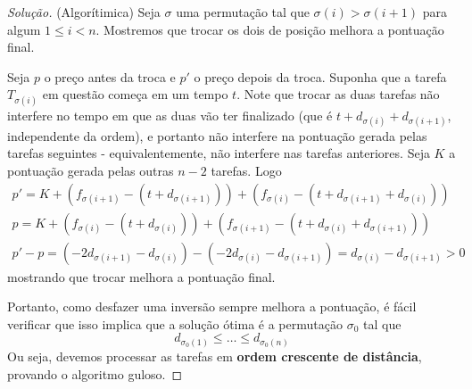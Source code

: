 \documentclass{article}
\newenvironment{solutionenv}{\begin{adjustwidth}{0.25cm}{0.25cm}\begin{proof}[Solução]}{\end{proof}\end{adjustwidth}}
\begin{document}
\begin{solutionenv}(Algorítimica)
  Seja \(\sigma\) uma permutação tal que \(\sigma(i) > \sigma(i + 1)\) para algum \(1 \leq i < n\). Mostremos que trocar os dois de posição melhora a pontuação final.

  Seja \(p\) o preço antes da troca e \(p'\) o preço depois da troca. Suponha que a tarefa \(T_{\sigma(i)}\) em questão começa em um tempo \(t\). Note que trocar as duas tarefas não interfere no tempo em que as duas vão ter finalizado (que é \(t + d_{\sigma(i)} + d_{\sigma(i + 1)}\), independente da ordem), e portanto não interfere na pontuação gerada pelas tarefas seguintes - equivalentemente, não interfere nas tarefas anteriores. Seja \(K\) a pontuação gerada pelas outras \(n - 2\) tarefas. Logo
  \begin{align*}
    p' = K + \left(f_{\sigma(i + 1)} - (t + d_{\sigma(i + 1)})\right) + \left(f_{\sigma(i)} - (t + d_{\sigma(i + 1)} + d_{\sigma(i)})\right)
    \\
    p = K + \left(f_{\sigma(i)} - (t + d_{\sigma(i)})\right) + \left(f_{\sigma(i + 1)} - (t + d_{\sigma(i)} + d_{\sigma(i + 1)})\right)
    \\
    p' - p = \left(-2d_{\sigma(i + 1)} - d_{\sigma(i)}\right) - \left(-2d_{\sigma(i)} - d_{\sigma(i + 1)}\right)
          = d_{\sigma(i)} - d_{\sigma(i + 1)} > 0
  \end{align*}
  mostrando que trocar melhora a pontuação final.

  Portanto, como desfazer uma inversão sempre melhora a pontuação, é fácil verificar que isso implica que a solução ótima é a permutação \(\sigma_{0}\) tal que
  \[d_{\sigma_{0}(1)} \leq \dotsc \leq d_{\sigma_{0}(n)}\]
  Ou seja, devemos processar as tarefas em \textbf{ordem crescente de distância}, provando o algoritmo guloso.
\end{solutionenv}
\end{document}
